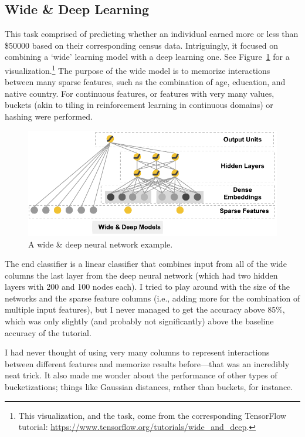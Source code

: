\documentclass{journal}
\begin{document}
\subsection{Wide \& Deep Learning}
This task comprised of predicting whether an individual earned more or less
than \$50000 based on their corresponding census data. Intriguingly, it
focused on combining a `wide' learning model with a deep learning one. See
Figure~\ref{fig:WideDeep} for a visualization.\footnote{This visualization,
and the task, come from the corresponding TensorFlow tutorial:
\url{https://www.tensorflow.org/tutorials/wide_and_deep}.}
The purpose of the wide model is to memorize interactions between many sparse
features, such as the combination of age, education, and native country. For
continuous features, or features with very many values, buckets (akin to tiling
in reinforcement learning in continuous domains) or hashing were performed.

\begin{figure}[h]
    \includegraphics[width=\textwidth]{wide_n_deep}
    \caption{A wide \& deep neural network example.}\label{fig:WideDeep}
\end{figure}

The end classifier is a linear classifier that combines input from all of the
wide columns the last layer from the deep neural network (which had two hidden
layers with 200 and 100 nodes each). I tried to play around with the size of
the networks and the sparse feature columns (i.e., adding more for the
combination of multiple input features), but I never managed to get the accuracy
above 85\%, which was only slightly (and probably not significantly) above the
baseline accuracy of the tutorial.

I had never thought of using very many columns to represent interactions between
different features and memorize results before---that was an incredibly neat
trick. It also made me wonder about the performance of other types of
bucketizations; things like Gaussian distances, rather than buckets, for
instance.
\end{document}
